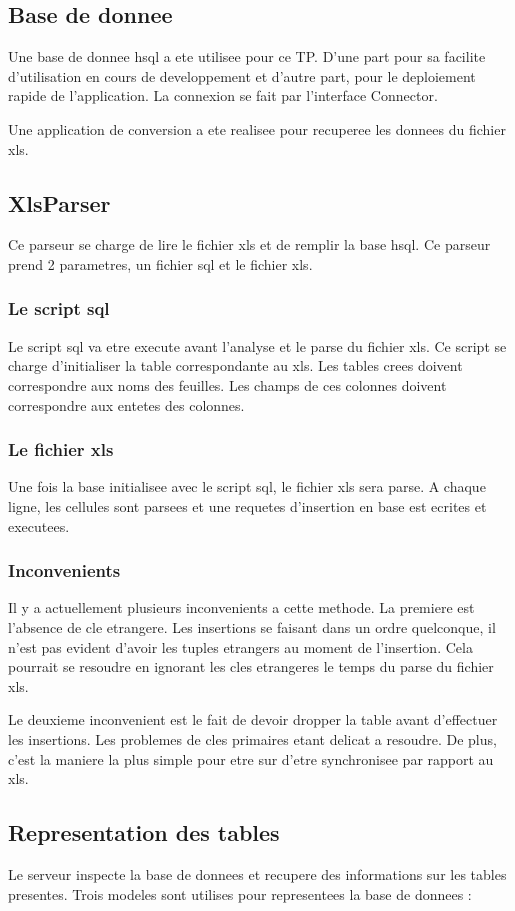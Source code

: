\subsection{Base de donnee}
Une base de donnee hsql a ete utilisee pour ce TP. D'une part pour sa facilite d'utilisation en cours de developpement et d'autre part, pour le deploiement rapide de l'application. La connexion se fait par l'interface Connector.

Une application de conversion a ete realisee pour recuperee les donnees du fichier xls.
\subsection{XlsParser}
Ce parseur se charge de lire le fichier xls et de remplir la base hsql. Ce parseur prend 2 parametres, un fichier sql et le fichier xls.
\subsubsection{Le script sql}
Le script sql va etre execute avant l'analyse et le parse du fichier xls. Ce script se charge d'initialiser la table correspondante au xls. Les tables crees doivent correspondre aux noms des feuilles. Les champs de ces colonnes doivent correspondre aux entetes des colonnes.
\subsubsection{Le fichier xls}
Une fois la base initialisee avec le script sql, le fichier xls sera parse. A chaque ligne, les cellules sont parsees et une requetes d'insertion en base est ecrites et executees.
\subsubsection{Inconvenients}
Il y a actuellement plusieurs inconvenients a cette methode. La premiere est l'absence de cle etrangere. Les insertions se faisant dans un ordre quelconque, il n'est pas evident d'avoir les tuples etrangers au moment de l'insertion. Cela pourrait se resoudre en ignorant les cles etrangeres le temps du parse du fichier xls.

Le deuxieme inconvenient est le fait de devoir dropper la table avant d'effectuer les insertions. Les problemes de cles primaires etant delicat a resoudre. De plus, c'est la maniere la plus simple pour etre sur d'etre synchronisee par rapport au xls.
\subsection{Representation des tables}
Le serveur inspecte la base de donnees et recupere des informations sur les tables presentes. Trois modeles sont utilises pour representees la base de donnees :
